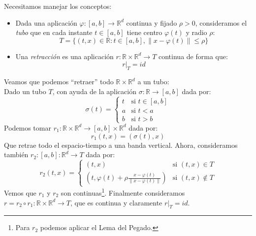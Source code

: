 \begin{definicion}
    Necesitamos manejar los conceptos:
    \begin{itemize}
        \item Dada una aplicación $\varphi:[a,b]\to \mathbb{R}^d$ continua y fijado $\rho>0$, consideramos el \textit{tubo} que en cada instante $t\in [a,b]$ tiene centro $\varphi(t)$ y radio $\rho$:
        \begin{equation*}
            T = \{(t,x)\in \mathbb{R} : t\in [a,b], \|x-\varphi(t)\| \leq \rho\}
        \end{equation*}
        \item Una \textit{retracción} es una aplicación $r:\mathbb{R}\times \mathbb{R}^d\to T$ continua de forma que:
            \begin{equation*}
                r\big|_T = id
            \end{equation*}
    \end{itemize}
\end{definicion}

\begin{ejemplo}
    Veamos que podemos ``retraer'' todo $\mathbb{R}\times \mathbb{R}^d$ a un tubo:\\

    \noindent
    Dado un tubo $T$, con ayuda de la aplicación $\sigma:\mathbb{R}\to [a,b]$ dada por:
    \begin{equation*}
        \sigma(t) = \left\{\begin{array}{ll}
                t & \text{si\ } t\in [a,b] \\
            a & \text{si\ } t<a \\
            b &\text{si\ } t>b
        \end{array}\right. 
    \end{equation*}
    Podemos tomar $r_1:\mathbb{R}\times \mathbb{R}^d\to [a,b]\times \mathbb{R}^d$ dada por:
    \begin{equation*}
        r_1(t,x) = (\sigma(t),x)
    \end{equation*}
    Que retrae todo el espacio-tiempo a una banda vertical. Ahora, consideramos también $r_2:[a,b]:\mathbb{R}^d\to T$ dada por:
    \begin{equation*}
        r_2(t,x) = \left\{\begin{array}{ll}
                (t,x) & \text{si\ } (t,x)\in T \\
                \left(t,\varphi(t)+\rho\frac{x-\varphi(t)}{\|x-\varphi(t)\|}\right)& \text{si\ } (t,x)\notin T
        \end{array}\right. 
    \end{equation*}
    Vemos que $r_1$ y $r_2$ son continuas\footnote{Para $r_2$ podemos aplicar el Lema del Pegado.}. Finalmente consideramos $r=r_2\circ r_1:\mathbb{R}\times \mathbb{R}^d\to T$, que es continua y claramente $r\big|_T = id$.
\end{ejemplo}

